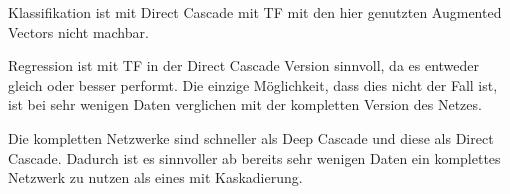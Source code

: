 Klassifikation ist mit Direct Cascade mit TF mit den hier genutzten Augmented Vectors nicht machbar. 

Regression ist mit TF in der Direct Cascade Version sinnvoll, da es entweder gleich oder besser performt. Die einzige Möglichkeit, dass dies 
nicht der Fall ist, ist bei sehr wenigen Daten verglichen mit der kompletten Version des Netzes. 

Die kompletten Netzwerke sind schneller als Deep Cascade und diese als Direct Cascade. Dadurch ist es sinnvoller ab bereits sehr wenigen 
Daten ein komplettes Netzwerk zu nutzen als eines mit Kaskadierung. 
